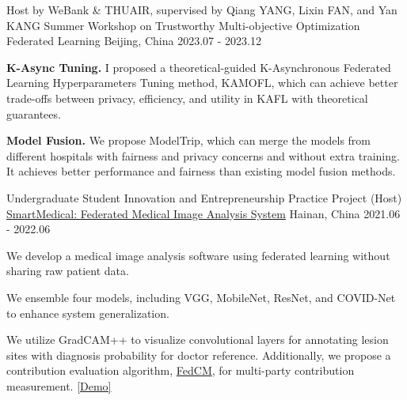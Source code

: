 \begin{cventries}
\cventry
{Host by WeBank \& THUAIR, supervised by Qiang YANG, Lixin FAN, and Yan KANG} %
{Summer Workshop on Trustworthy Multi-objective Optimization Federated Learning} %
{Beijing, China} %
{2023.07 - 2023.12} %
{
    \begin{cvitems}
        \item {\textbf{K-Async Tuning.} I proposed a theoretical-guided K-Asynchronous Federated Learning Hyperparameters Tuning method, KAMOFL, which can achieve better trade-offs between privacy, efficiency, and utility in KAFL with theoretical guarantees.}
        \item {\textbf{Model Fusion.} We propose ModelTrip, which can merge the models from different hospitals with fairness and privacy concerns and without extra training. It achieves better performance and fairness than existing model fusion methods.}
    \end{cvitems}
}


\cventry
{Undergraduate Student Innovation and Entrepreneurship Practice Project (Host)} %
{\href{https://www.bj-yan.top/paddle-fl-gui/}{SmartMedical: Federated Medical Image Analysis System}} %
{Hainan, China} %
{2021.06 - 2022.06} %
{
    \begin{cvitems}
        \item {We develop a medical image analysis software using federated learning without sharing raw patient data.}
        \item {We ensemble four models, including VGG, MobileNet, ResNet, and COVID-Net to enhance system generalization.}
        \item {We utilize GradCAM++ to visualize convolutional layers for annotating lesion sites with diagnosis probability for doctor reference. 
        Additionally, we propose a contribution evaluation algorithm, \href{https://ieeexplore.ieee.org/abstract/document/9534451/}{FedCM}, for multi-party contribution measurement.
        \textcolor{awesome-red}{\href{https://www.bj-yan.top/paddle-fl-gui/}{[Demo]}}
        }
    \end{cvitems}
}



\end{cventries}



